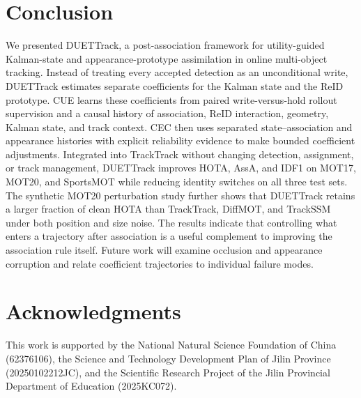 \documentclass[a4paper,fleqn]{cas-sc}
\begin{document}
\FloatBarrier
\section{Conclusion}
We presented DUETTrack, a post-association framework for utility-guided Kalman-state and appearance-prototype assimilation in online multi-object tracking. Instead of treating every accepted detection as an unconditional write, DUETTrack estimates separate coefficients for the Kalman state and the ReID prototype. CUE learns these coefficients from paired write-versus-hold rollout supervision and a causal history of association, ReID interaction, geometry, Kalman state, and track context. CEC then uses separated state--association and appearance histories with explicit reliability evidence to make bounded coefficient adjustments. Integrated into TrackTrack without changing detection, assignment, or track management, DUETTrack improves HOTA, AssA, and IDF1 on MOT17, MOT20, and SportsMOT while reducing identity switches on all three test sets. The synthetic MOT20 perturbation study further shows that DUETTrack retains a larger fraction of clean HOTA than TrackTrack, DiffMOT, and TrackSSM under both position and size noise. The results indicate that controlling what enters a trajectory after association is a useful complement to improving the association rule itself. Future work will examine occlusion and appearance corruption and relate coefficient trajectories to individual failure modes.

\section*{Acknowledgments}
This work is supported by the National Natural Science Foundation of China (62376106), the Science and Technology Development Plan of Jilin Province (20250102212JC), and the Scientific Research Project of the Jilin Provincial Department of Education (2025KC072).

\printcredits



\end{document}
